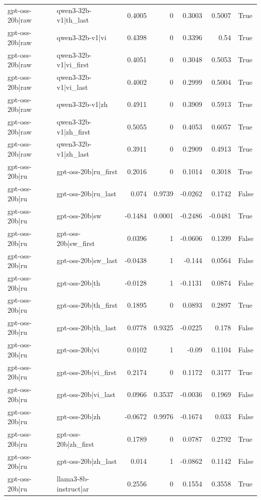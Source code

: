 \begin{table}
\begin{tabular}{l l r r r r l}
gpt-oss-20b|raw & qwen3-32b-v1|th_last & 0.4005 & 0 & 0.3003 & 0.5007 & True \\
gpt-oss-20b|raw & qwen3-32b-v1|vi & 0.4398 & 0 & 0.3396 & 0.54 & True \\
gpt-oss-20b|raw & qwen3-32b-v1|vi_first & 0.4051 & 0 & 0.3048 & 0.5053 & True \\
gpt-oss-20b|raw & qwen3-32b-v1|vi_last & 0.4002 & 0 & 0.2999 & 0.5004 & True \\
gpt-oss-20b|raw & qwen3-32b-v1|zh & 0.4911 & 0 & 0.3909 & 0.5913 & True \\
gpt-oss-20b|raw & qwen3-32b-v1|zh_first & 0.5055 & 0 & 0.4053 & 0.6057 & True \\
gpt-oss-20b|raw & qwen3-32b-v1|zh_last & 0.3911 & 0 & 0.2909 & 0.4913 & True \\
gpt-oss-20b|ru & gpt-oss-20b|ru_first & 0.2016 & 0 & 0.1014 & 0.3018 & True \\
gpt-oss-20b|ru & gpt-oss-20b|ru_last & 0.074 & 0.9739 & -0.0262 & 0.1742 & False \\
gpt-oss-20b|ru & gpt-oss-20b|sw & -0.1484 & 0.0001 & -0.2486 & -0.0481 & True \\
gpt-oss-20b|ru & gpt-oss-20b|sw_first & 0.0396 & 1 & -0.0606 & 0.1399 & False \\
gpt-oss-20b|ru & gpt-oss-20b|sw_last & -0.0438 & 1 & -0.144 & 0.0564 & False \\
gpt-oss-20b|ru & gpt-oss-20b|th & -0.0128 & 1 & -0.1131 & 0.0874 & False \\
gpt-oss-20b|ru & gpt-oss-20b|th_first & 0.1895 & 0 & 0.0893 & 0.2897 & True \\
gpt-oss-20b|ru & gpt-oss-20b|th_last & 0.0778 & 0.9325 & -0.0225 & 0.178 & False \\
gpt-oss-20b|ru & gpt-oss-20b|vi & 0.0102 & 1 & -0.09 & 0.1104 & False \\
gpt-oss-20b|ru & gpt-oss-20b|vi_first & 0.2174 & 0 & 0.1172 & 0.3177 & True \\
gpt-oss-20b|ru & gpt-oss-20b|vi_last & 0.0966 & 0.3537 & -0.0036 & 0.1969 & False \\
gpt-oss-20b|ru & gpt-oss-20b|zh & -0.0672 & 0.9976 & -0.1674 & 0.033 & False \\
gpt-oss-20b|ru & gpt-oss-20b|zh_first & 0.1789 & 0 & 0.0787 & 0.2792 & True \\
gpt-oss-20b|ru & gpt-oss-20b|zh_last & 0.014 & 1 & -0.0862 & 0.1142 & False \\
gpt-oss-20b|ru & llama3-8b-instruct|ar & 0.2556 & 0 & 0.1554 & 0.3558 & True \\

\end{tabular}
\end{table}
